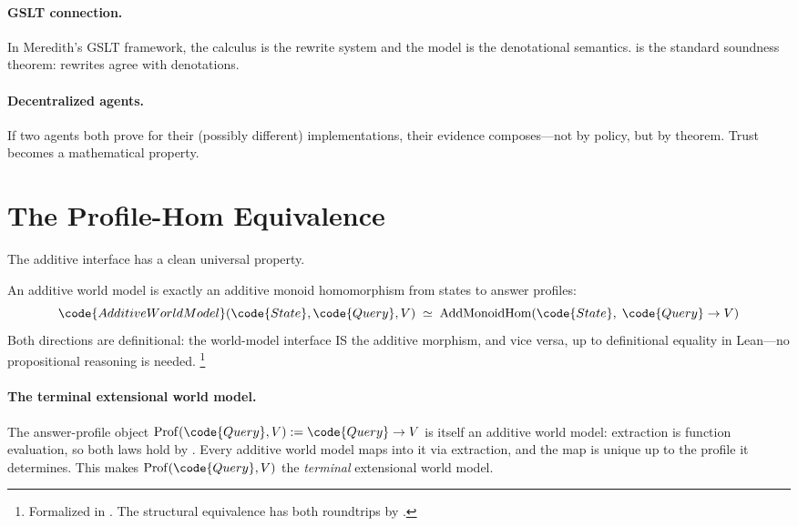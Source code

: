 \documentclass[11pt,openany]{report}
\begin{document}
\paragraph{GSLT connection.}
In Meredith's GSLT framework, the calculus is the rewrite system
and the model is the denotational semantics.
 is the standard soundness theorem: rewrites
agree with denotations.

\paragraph{Decentralized agents.}
If two agents both prove  for their (possibly
different) implementations, their evidence composes---not by
policy, but by theorem.  Trust becomes a mathematical property.


\section{The Profile-Hom Equivalence}
\label{sec:profile-hom}

The additive interface has a clean universal property.

\begin{theorem}
\label{thm:universal-property}
An additive world model is exactly an additive monoid homomorphism
from states to answer profiles:
\[
  \code{AdditiveWorldModel}(\code{State}, \code{Query}, V)
  \;\simeq\;
  \mathrm{AddMonoidHom}(\code{State},\; \code{Query} \to V)
\]
Both directions are definitional: the world-model interface IS the
additive morphism, and vice versa, up to definitional equality in
Lean---no propositional reasoning is needed.%
\footnote{Formalized in .
The structural equivalence  has both
roundtrips by .}
\end{theorem}

\paragraph{The terminal extensional world model.}
The answer-profile object $\mathrm{Prof}(\code{Query}, V) :=
\code{Query} \to V$ is itself an additive world model: extraction is
function evaluation, so both laws hold by .  Every additive
world model maps into it via extraction, and the map is unique up to
the profile it determines.  This makes $\mathrm{Prof}(\code{Query}, V)$
the \emph{terminal} extensional world model.
\end{document}
